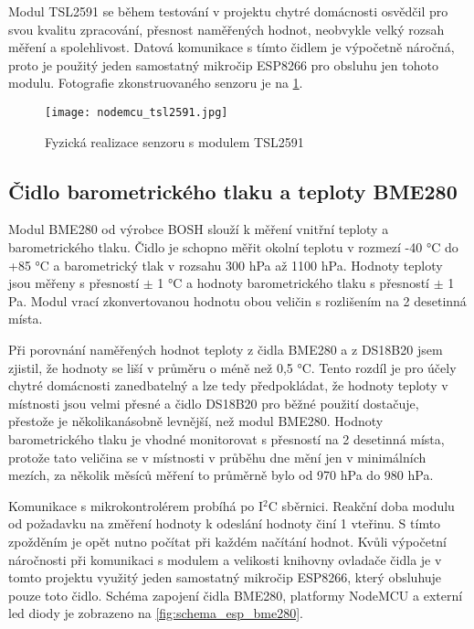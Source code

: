 Modul TSL2591 se během testování v projektu chytré domácnosti osvědčil pro svou kvalitu zpracování, přesnost naměřených hodnot, neobvykle velký rozsah měření a spolehlivost. Datová komunikace s tímto čidlem je výpočetně náročná, proto je použitý jeden samostatný mikročip ESP8266 pro obsluhu jen tohoto modulu. Fotografie zkonstruovaného senzoru je na \cref{fig:nodemcu_tsl2591}.

\begin{figure}[H]
  \centering
  \texttt{[image: nodemcu\_tsl2591.jpg]}
  \caption{Fyzická realizace senzoru s modulem TSL2591}
  \label{fig:nodemcu_tsl2591}
\end{figure} 

\subsection{Čidlo barometrického tlaku a teploty BME280}

Modul BME280 od výrobce BOSH slouží k měření vnitřní teploty a barometrického tlaku. Čidlo je schopno měřit okolní teplotu v rozmezí -40 \si{\degree}C do +85 \si{\degree}C a barometrický tlak v rozsahu 300 \si{hPa} až 1100 \si{hPa}. Hodnoty teploty jsou měřeny s přesností $\pm$ 1 \si{\degree}C a hodnoty barometrického tlaku s přesností $\pm$ 1 \si{Pa}. Modul vrací zkonvertovanou hodnotu obou veličin s rozlišením na 2 desetinná místa. \par
Při porovnání naměřených hodnot teploty z čidla BME280 a z DS18B20 jsem zjistil, že hodnoty se liší v průměru o méně než 0,5 \si{\degree}C. Tento rozdíl je pro účely chytré domácnosti zanedbatelný a lze tedy předpokládat, že hodnoty teploty v místnosti jsou velmi přesné a čidlo DS18B20 pro běžné použití dostačuje, přestože je několikanásobně levnější, než modul BME280. Hodnoty barometrického tlaku je vhodné monitorovat s přesností na 2 desetinná místa, protože tato veličina se v místnosti v průběhu dne mění jen v minimálních mezích, za několik měsíců měření to průměrně bylo od 970 \si{hPa} do 980 \si{hPa}.\par
Komunikace s mikrokontrolérem probíhá po I$^2$C sběrnici. Reakční doba modulu od požadavku na změření hodnoty k odeslání hodnoty činí 1 vteřinu. S tímto zpožděním je opět nutno počítat při každém načítání hodnot. Kvůli výpočetní náročnosti při komunikaci s modulem a velikosti knihovny ovladače čidla je v tomto projektu využitý jeden samostatný mikročip ESP8266, který obsluhuje pouze toto čidlo. Schéma zapojení čidla BME280, platformy NodeMCU a externí led diody je zobrazeno na \cref{fig:schema_esp_bme280}.

